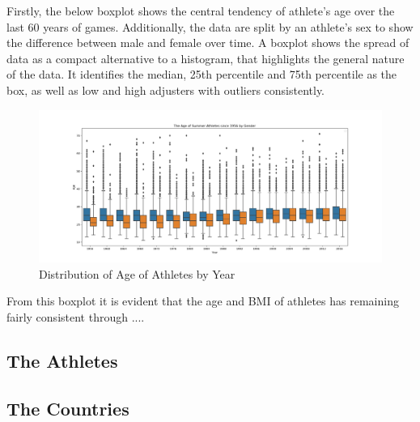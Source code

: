 \documentclass[a4 paper, 12pt]{article}
\begin{document}
    Firstly, the below boxplot shows the central tendency of athlete's age over the last 60 years of games. Additionally, the data are split by an athlete's sex to show the difference between male and female over time. A boxplot shows the spread of data as a compact alternative to a histogram, that highlights the general nature of the data. It identifies the median, 25th percentile and 75th percentile as the box, as well as low and high adjusters with outliers consistently. 
        \begin{figure} [H]
            \centering
            \includegraphics[width=\textwidth, frame]
                {./images/graph/athlete_age_boxplot.png}      
                \caption{Distribution of Age of Athletes by Year} 
        \end{figure}
    From this boxplot it is evident that the age and BMI of athletes has remaining fairly consistent through ....

    



    \subsection{The Athletes}

    \subsection{The Countries}
\end{document}
